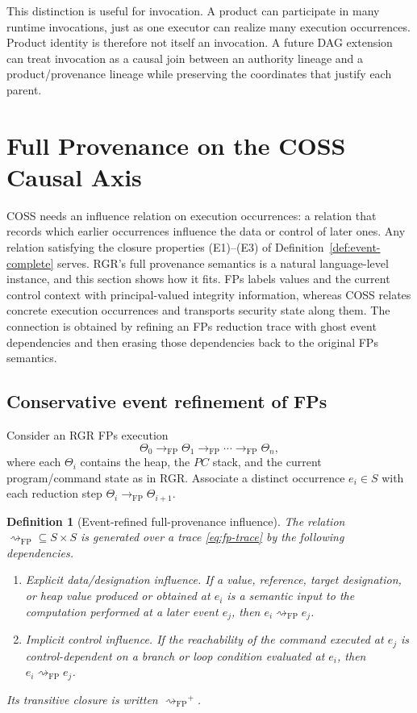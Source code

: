 \documentclass[10pt,twocolumn]{article}
\newcommand{\Model}{\textnormal{\textsc{COSS}}\xspace}
\newcommand{\FP}{\mathrm{FP}}
\newcommand{\Influence}{\mathrel{\rightsquigarrow_{\!\FP}}}
\newtheorem{definition}{Definition}
\begin{document}
This distinction is useful for invocation.  A product can participate in many
runtime invocations, just as one executor can realize many execution
occurrences.  Product identity is therefore not itself an invocation.  A future
DAG extension can treat invocation as a causal join between an authority
lineage and a product/provenance lineage while preserving the coordinates that
justify each parent.

\section{Full Provenance on the COSS Causal Axis}
\label{sec:fp-axis}

\Model needs an influence relation on execution occurrences: a relation that
records which earlier occurrences influence the data or control of later ones.
Any relation satisfying the closure properties (E1)--(E3) of
Definition~\ref{def:event-complete} serves. RGR's full provenance semantics is a
natural language-level instance, and this section shows how it fits.
FPs labels values and the current control context with principal-valued
integrity information, whereas \Model relates concrete execution occurrences and
transports security state along them. The connection is obtained by refining
an FPs reduction trace with ghost event dependencies and then erasing those
dependencies back to the original FPs semantics.

\subsection{Conservative event refinement of FPs}

Consider an RGR FPs execution
\begin{equation}
  \Theta_0\to_{\FP}\Theta_1\to_{\FP}\cdots\to_{\FP}\Theta_n,
  \label{eq:fp-trace}
\end{equation}
where each $\Theta_i$ contains the heap, the $PC$ stack, and the current
program/command state as in RGR. Associate a distinct occurrence $e_i\in S$
with each reduction step $\Theta_i\to_{\FP}\Theta_{i+1}$.

\begin{definition}[Event-refined full-provenance influence]
The relation $\Influence\subseteq S\times S$ is generated over a trace
\eqref{eq:fp-trace} by the following dependencies.
\begin{enumerate}[label=(F\arabic*),leftmargin=*]
  \item \emph{Explicit data/designation influence.} If a value, reference,
        target designation, or heap value produced or obtained at $e_i$ is a
        semantic input to the computation performed at a later event $e_j$,
        then $e_i\Influence e_j$.
  \item \emph{Implicit control influence.} If the reachability of the command
        executed at $e_j$ is control-dependent on a branch or loop condition
        evaluated at $e_i$, then $e_i\Influence e_j$.
\end{enumerate}
Its transitive closure is written $\Influence^{+}$.
\end{definition}
\end{document}
